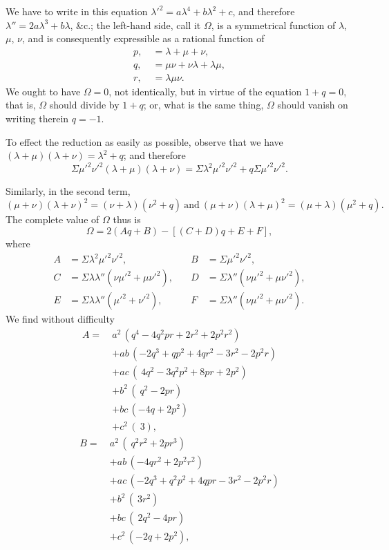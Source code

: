 \documentclass[11pt,a4paper]{article}
\begin{document}
We have to write in this equation $\lambda'^2 = a\lambda^4 + b\lambda^2 + c$, and therefore $\lambda'' = 2a\lambda^3 + b\lambda$, \&c.; the left-hand side, call it $\Omega$, is a symmetrical function of $\lambda$, $\mu$, $\nu$, and is consequently expressible as a rational function of
\begin{align*}
p, &\ = \lambda + \mu + \nu, \\
q, &\ = \mu\nu + \nu\lambda + \lambda\mu, \\
r, &\ = \lambda\mu\nu.
\end{align*}
We ought to have $\Omega = 0$, not identically, but in virtue of the equation $1 + q = 0$, that is, $\Omega$ should divide by $1 + q$; or, what is the same thing, $\Omega$ should vanish on writing therein $q = -1$.

To effect the reduction as easily as possible, observe that we have $(\lambda + \mu)(\lambda + \nu) = \lambda^2 + q$; and therefore
\[
\Sigma\mu'^2 \nu'^2 (\lambda + \mu)(\lambda + \nu) = \Sigma \lambda^2 \mu'^2 \nu'^2 + q \Sigma \mu'^2 \nu'^2.
\]

Similarly, in the second term,
\[
(\mu + \nu)(\lambda + \nu)^2 = (\nu + \lambda)(\nu^2 + q)\ \text{and}\ (\mu + \nu)(\lambda + \mu)^2 = (\mu + \lambda)(\mu^2 + q).
\]
The complete value of $\Omega$ thus is
\[
\Omega = 2(Aq + B) - [(C + D)q + E + F],
\]
where
\begin{align*}
A &= \Sigma \lambda^2 \mu'^2 \nu'^2,\quad & B &= \Sigma \mu'^2 \nu'^2, \\
C &= \Sigma \lambda \lambda'' (\nu \mu'^2 + \mu \nu'^2),\quad & D &= \Sigma \lambda'' (\nu \mu'^2 + \mu \nu'^2), \\
E &= \Sigma \lambda \lambda'' (\mu'^2 + \nu'^2),\quad & F &= \Sigma \lambda'' (\nu \mu'^2 + \mu \nu'^2).
\end{align*}
We find without difficulty
\begin{align*}
A = \ & a^2\,( q^4 - 4q^2 pr + 2r^2 + 2p^2 r^2) \\
& + ab\,(-2q^3 + qp^2 + 4qr^2 - 3r^2 - 2p^2 r) \\
& + ac\,(\ 4q^2 - 3q^2 p^2 + 8pr + 2p^2) \\
& + b^2\,(\ q^2 - 2pr) \\
& + bc\,(-4q + 2p^2) \\
& + c^2\,(\ 3),
\end{align*}
\begin{align*}
B = \ & a^2\,(\ q^2 r^2 + 2pr^3) \\
& + ab\,(-4qr^2 + 2p^2 r^2) \\
& + ac\,(-2q^3 + q^2 p^2 + 4qpr - 3r^2 - 2p^2 r) \\
& + b^2\,(\ 3r^2) \\
& + bc\,(\ 2q^2 - 4pr) \\
& + c^2\,(-2q + 2p^2),
\end{align*}
\end{document}
